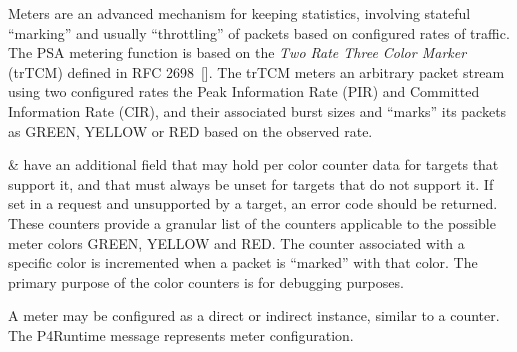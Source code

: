 \documentclass[11pt]{article}
\begin{document}
{%
\noindent{}Meters are an advanced mechanism for keeping statistics, involving stateful
\textquotedblleft{}marking\textquotedblright{} and usually \textquotedblleft{}throttling\textquotedblright{} of packets based on configured rates of
traffic. The PSA metering function is based on the \emph{Two Rate Three Color Marker}
(trTCM) defined in RFC 2698~[]. The trTCM meters an arbitrary packet
stream using two configured rates \textemdash{} the Peak Information Rate (PIR) and
Committed Information Rate (CIR), and their associated burst sizes \textemdash{} and
\textquotedblleft{}marks\textquotedblright{} its packets as GREEN, YELLOW or RED based on the observed rate.%

 \&  have an additional field  that
may hold per color counter data for targets that support it, and that must
always be unset for targets that do not support it. If set in a request and
unsupported by a target, an  error code should be returned.
These counters provide a granular list of the counters applicable to the
possible meter colors GREEN, YELLOW and RED. The counter associated with a
specific color is incremented when a packet is \textquotedblleft{}marked\textquotedblright{} with that color. The
primary purpose of the color counters is for debugging purposes.%

A meter may be configured as a direct or indirect instance, similar to a
counter. The  P4Runtime message represents meter configuration.%

}
\end{document}
